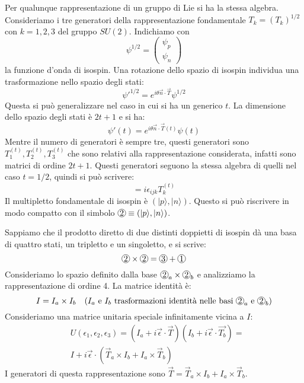  Per qualunque rappresentazione di un gruppo di Lie si ha
la stessa algebra.
Consideriamo i tre generatori della rappresentazione fondamentale
$T_k=(T_k)^{1/2}$ con $k=1,2,3$ del gruppo $SU(2)$. Indichiamo con
\[
\psi^{1/2}=
\begin{pmatrix}
\psi_p\\
\psi_n
\end{pmatrix}
\]
la funzione d'onda di isospin. Una rotazione dello spazio di isospin individua una trasformazione nello spazio degli stati:
\begin{equation}
\psi'^{1/2}=e^{i\theta\vec{n}\cdot\vec{T}}\psi^{1/2}
\end{equation}
Questa si può generalizzare nel caso in cui si ha un generico $t$. La dimensione dello spazio degli stati è $2t+1$ e si ha:
\[
\psi'(t)=e^{i\theta\vec{n}\cdot\vec{T}(t)}\psi(t)
\]
Mentre il numero di generatori è sempre tre, questi generatori sono $T_1^{(t)},T_2^{(t)},T_3^{(t)}$ che
sono relativi alla rappresentazione considerata, infatti sono matrici di ordine $2t+1$.
Questi generatori seguono la stessa algebra di quelli nel caso $t=1/2$, quindi si può scrivere:
\begin{equation}
[T_i^{(t)},T_j^{(t)}]=i\epsilon_{ijk}T_k^{(t)}
\end{equation}
Il multipletto fondamentale di isospin è $(|p\rangle,|n\rangle)$. Questo si può
riscrivere in modo compatto con il simbolo $\Ci{2} \equiv (|p\rangle,|n\rangle)$.

Sappiamo che il prodotto diretto di due distinti doppietti di isospin dà una basa di quattro stati, un tripletto e
un singoletto, e si scrive:
\[
\Ci{2}\times\Ci{2}=\Ci{3}+\Ci{1}
\]
Consideriamo lo spazio definito dalla base $\Ci{2}_a\times\Ci{2}_b$ e analizziamo la rappresentazione di ordine
4. La matrice identità è:
\[
I=I_a\times I_b\quad(\text{$I_a$ e $I_b$ trasformazioni identità nelle basi $\Ci{2}_a$ e $\Ci{2}_b$})
\]
Consideriamo una matrice unitaria speciale infinitamente vicina a $I$:
\begin{equation}
\begin{split}
&U(\epsilon_1,\epsilon_2,\epsilon_3)=(I_a+i\vec{\epsilon}\cdot\vec{T})(I_b+i\vec{\epsilon}\cdot\vec{T_b})=\\
&I+i\vec{\epsilon}\cdot(\vec{T}_a\times I_b+I_a\times\vec{T}_b)
\end{split}
\end{equation}
I generatori di questa rappresentazione sono $\vec{T}=\vec{T}_a\times I_b+I_a\times\vec{T}_b$.

